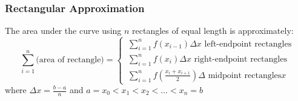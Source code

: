 \documentclass[11pt]{article}
\begin{document}
\subsubsection*{Rectangular Approximation}
The area under the curve using $n$ rectangles of equal length is approximately:
\[
    \sum_{i=1}^n\text{(area of rectangle)}=
    \begin{cases}
        \,\displaystyle\sum_{i=1}^nf(x_{i-1})\Delta x\text{ left-endpoint rectangles}\\[15pt]
        \,\displaystyle\sum_{i=1}^nf(x_i)\Delta x\text{ right-endpoint rectangles}\\[15pt]
        \,\displaystyle\sum_{i=1}^nf(\frac{x_i+x_{i+1}}{2})\Delta\text{ midpoint rectangles}x
    \end{cases}
\]where $\displaystyle\Delta x=\frac{b-a}{n}$ and $a=x_0<x_1<x_2<\dots<x_n=b$
\end{document}

